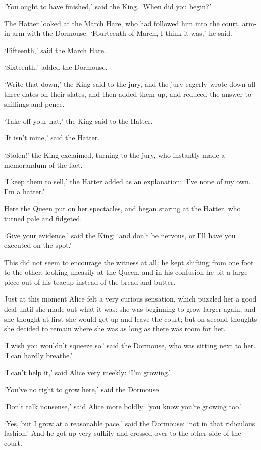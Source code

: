 \documentclass[12pt]{article}
\begin{document}
\begin{Parallel}[p]{}{}
{‘You ought to have finished,’ said the King. ‘When did you begin?’

The Hatter looked at the March Hare, who had followed him into the court, arm-in-arm with the Dormouse. ‘Fourteenth of March, I think it was,’ he said.

‘Fifteenth,’ said the March Hare.

‘Sixteenth,’ added the Dormouse.

‘Write that down,’ the King said to the jury, and the jury eagerly wrote down all three dates on their slates, and then added them up, and reduced the answer to shillings and pence.

‘Take off your hat,’ the King said to the Hatter.

‘It isn’t mine,’ said the Hatter.

‘Stolen!’ the King exclaimed, turning to the jury, who instantly made a memorandum of the fact.

‘I keep them to sell,’ the Hatter added as an explanation; ‘I’ve none of my own. I’m a hatter.’

Here the Queen put on her spectacles, and began staring at the Hatter, who turned pale and fidgeted.

‘Give your evidence,’ said the King; ‘and don’t be nervous, or I’ll have you executed on the spot.’

This did not seem to encourage the witness at all: he kept shifting from one foot to the other, looking uneasily at the Queen, and in his confusion he bit a large piece out of his teacup instead of the bread-and-butter.

Just at this moment Alice felt a very curious sensation, which puzzled her a good deal until she made out what it was: she was beginning to grow larger again, and she thought at first she would get up and leave the court; but on second thoughts she decided to remain where she was as long as there was room for her.

‘I wish you wouldn’t squeeze so.’ said the Dormouse, who was sitting next to her. ‘I can hardly breathe.’

‘I can’t help it,’ said Alice very meekly: ‘I’m growing.’

‘You’ve no right to grow here,’ said the Dormouse.

‘Don’t talk nonsense,’ said Alice more boldly: ‘you know you’re growing too.’

‘Yes, but I grow at a reasonable pace,’ said the Dormouse: ‘not in that ridiculous fashion.’ And he got up very sulkily and crossed over to the other side of the court.

}
\end{Parallel}
\end{document}
